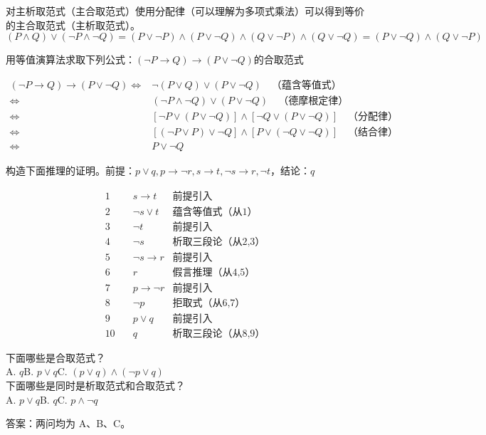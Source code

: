 \documentclass[lang=cn,11pt]{elegantbook}
\begin{document}
对主析取范式（主合取范式）使用分配律（可以理解为多项式乘法）可以得到等价的主合取范式（主析取范式）。
\[(P \land Q) \lor (\neg P \land \neg Q) = (P\lor \neg P)\land (P\lor \neg Q)\land (Q\lor \neg P)\land (Q\lor \neg Q)= (P\lor \neg Q)\land (Q\lor \neg P) \]
\begin{example}[2023年真题]
    用等值演算法求取下列公式：$(\neg P\to Q)\to(P\lor\neg Q)$的合取范式
\end{example}
\vspace{-30pt}
\begin{align*}
 (\neg P \to Q) \to (P \lor \neg Q) 
\Leftrightarrow &  \neg (P \lor Q) \lor (P \lor \neg Q) \quad \text{（蕴含等值式）} \\
\Leftrightarrow & (\neg P \land \neg Q) \lor (P \lor \neg Q) \quad \text{（德摩根定律）} \\
\Leftrightarrow & [\neg P \lor (P \lor \neg Q)] \land [\neg Q \lor (P \lor \neg Q)] \quad \text{（分配律）} \\
\Leftrightarrow & [(\neg P \lor P) \lor \neg Q] \land [P \lor (\neg Q \lor \neg Q)] \quad \text{（结合律）} \\
\Leftrightarrow & P \lor \neg Q 
\end{align*}
\begin{example}[2023年真题]
构造下面推理的证明。前提：$p\lor q, p\to \neg r, s\to t,\neg s\to r, \neg t$，结论：$q$
\end{example}
\vspace{-30pt}
\begin{align*}
1\quad& s\to t&\text{前提引入}\\
2\quad& \neg s\lor t&\text{蕴含等值式（从1）}\\
3\quad& \neg t&\text{前提引入}\\
4\quad& \neg s&\text{析取三段论（从2,3）}\\
5\quad& \neg s\to r&\text{前提引入}\\
6\quad& r&\text{假言推理（从4,5）}\\
7\quad& p\to \neg r&\text{前提引入}\\
8\quad& \neg p&\text{拒取式（从6,7）}\\
9\quad& p\lor q&\text{前提引入}\\
10\quad& q&\text{析取三段论（从8,9）}
\end{align*}
\begin{example}
    下面哪些是合取范式？\\
    A. $q$\quad B. $p\lor q$\quad C. $(p\lor q)\land(\neg p\lor q)$\\
    下面哪些是同时是析取范式和合取范式？\\
    A. $p\lor q$\quad B. $q$\quad C. $p\land \neg q$
\end{example}
答案：两问均为 A、B、C。
\end{document}
